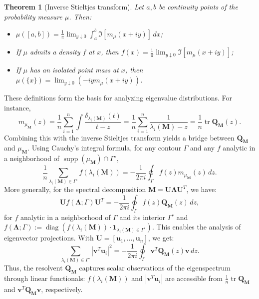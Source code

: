 \documentclass[12pt]{article}
\newtheorem{theorem}{Theorem}
\DeclareMathOperator{\tr}{tr}
\begin{document}
\begin{theorem}[Inverse Stieltjes transform]
Let $a, b$ be continuity points of the probability measure $\mu$. Then:
\begin{itemize}
    \item $\mu([a, b]) = \frac{1}{\pi} \lim_{y \downarrow 0} \int_a^b \Im[m_\mu(x + iy)] \, dx$;
    \item If $\mu$ admits a density $f$ at $x$, then $f(x) = \frac{1}{\pi} \lim_{y \downarrow 0} \Im[m_\mu(x + iy)]$;
    \item If $\mu$ has an isolated point mass at $x$, then $\mu(\{x\}) = \lim_{y \downarrow 0} ( -iy m_\mu(x + iy))$.
\end{itemize}
\end{theorem}

These definitions form the basis for analyzing eigenvalue distributions. For instance, 
$$
m_{\mu_\mathbf{M}}(z)=\frac1n\sum_{i=1}^{n}\int\frac{\delta_{\lambda_i(\mathbf{M})}(t)}{t-z}=\frac1n\sum_{i=1}^{n}\frac{1}{\lambda_i(\mathbf{M})-z}=\frac1n\tr \mathbf{Q}_\mathbf{M}(z).
$$ 
Combining this with the inverse Stieltjes transform yields a bridge between $\mathbf{Q}_\mathbf{M}$ and $\mu_\mathbf{M}$. Using Cauchy's integral formula, for any contour $\Gamma$ and any $f$ analytic in a neighborhood of $\operatorname{supp}(\mu_\mathbf{M}) \cap \Gamma^\circ$,
$$
\frac{1}{n} \sum_{\lambda_i(\mathbf{M}) \in \Gamma^\circ} f(\lambda_i(\mathbf{M})) = -\frac{1}{2\pi i} \oint_{\Gamma} f(z) m_{\mu_{\mathbf{M}}}(z) \, dz.
$$
More generally, for the spectral decomposition $\mathbf{M} = \mathbf{U} \mathbf{\Lambda} \mathbf{U}^T$, we have:
$$
\mathbf{U}f(\mathbf{\Lambda}; \Gamma)\mathbf{U}^T = -\frac{1}{2\pi i} \oint_{\Gamma} f(z) \mathbf{Q}_\mathbf{M}(z) \, dz,
$$
for $f$ analytic in a neighborhood of $\Gamma$ and its interior $\Gamma^\circ$ and $f(\mathbf{\mathbf{\Lambda}}; \Gamma) := \operatorname{diag}(f(\lambda_i(\mathbf{M})) \cdot \mathbf{1}_{\lambda_i(\mathbf{M}) \in \Gamma^\circ})$. This enables the analysis of eigenvector projections. With $\mathbf{U} = [\mathbf{u}_1, \ldots, \mathbf{u}_n]$, we get:
$$
\sum_{\lambda_i(\mathbf{M}) \in \Gamma^\circ} |\mathbf{v}^T \mathbf{u}_i|^2 = -\frac{1}{2\pi i} \oint_{\Gamma} \mathbf{v}^T \mathbf{Q}_\mathbf{M}(z) \mathbf{v} \, dz.
$$
Thus, the resolvent $\mathbf{Q}_\mathbf{M}$ captures scalar observations of the eigenspectrum through linear functionals: $f(\lambda_i(\mathbf{M}))$ and $|\mathbf{v}^T \mathbf{u}_i|$ are accessible from $\frac{1}{n} \tr \mathbf{Q}_\mathbf{M}$ and $\mathbf{v}^T \mathbf{Q}_\mathbf{M} \mathbf{v}$, respectively.
\end{document}
